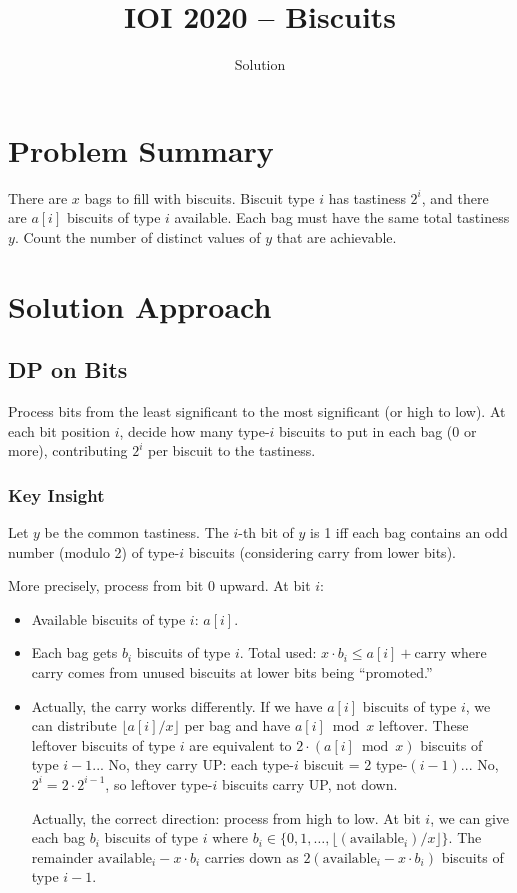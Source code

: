 \documentclass[11pt,a4paper]{article}
\title{IOI 2020 -- Biscuits}
\author{Solution}
\date{}
\begin{document}
\maketitle

\section{Problem Summary}
There are $x$ bags to fill with biscuits. Biscuit type $i$ has tastiness $2^i$, and there are $a[i]$ biscuits of type $i$ available. Each bag must have the same total tastiness $y$. Count the number of distinct values of $y$ that are achievable.

\section{Solution Approach}

\subsection{DP on Bits}
Process bits from the least significant to the most significant (or high to low). At each bit position $i$, decide how many type-$i$ biscuits to put in each bag (0 or more), contributing $2^i$ per biscuit to the tastiness.

\subsubsection{Key Insight}
Let $y$ be the common tastiness. The $i$-th bit of $y$ is 1 iff each bag contains an odd number (modulo 2) of type-$i$ biscuits (considering carry from lower bits).

More precisely, process from bit 0 upward. At bit $i$:
\begin{itemize}
  \item Available biscuits of type $i$: $a[i]$.
  \item Each bag gets $b_i$ biscuits of type $i$. Total used: $x \cdot b_i \le a[i] + \text{carry}$ where carry comes from unused biscuits at lower bits being ``promoted.''
  \item Actually, the carry works differently. If we have $a[i]$ biscuits of type $i$, we can distribute $\lfloor a[i] / x \rfloor$ per bag and have $a[i] \bmod x$ leftover. These leftover biscuits of type $i$ are equivalent to $2 \cdot (a[i] \bmod x)$ biscuits of type $i-1$... No, they carry UP: each type-$i$ biscuit = 2 type-$(i-1)$... No, $2^i = 2 \cdot 2^{i-1}$, so leftover type-$i$ biscuits carry UP, not down.

  Actually, the correct direction: process from high to low. At bit $i$, we can give each bag $b_i$ biscuits of type $i$ where $b_i \in \{0, 1, \ldots, \lfloor(\text{available}_i) / x\rfloor\}$. The remainder $\text{available}_i - x \cdot b_i$ carries down as $2(\text{available}_i - x \cdot b_i)$ biscuits of type $i-1$.
\end{itemize}
\end{document}
